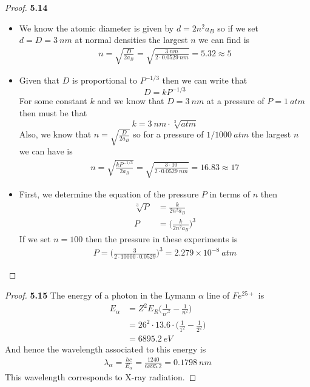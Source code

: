 \documentclass[11pt]{article}
\theoremstyle{definition}
\begin{document}
\begin{proof}{\textbf{5.14}}
\begin{itemize}
    \item [(a)] We know the atomic diameter is given by $d = 2n^2 a_B$
    so if we set $d = D = 3~nm$ at normal densities the largest $n$ we can find
    is
    \begin{align*}
        n = \sqrt{\frac{D}{2a_B}} = \sqrt{\frac{3~nm}{2\cdot 0.0529~nm}}
        = 5.32 \approx 5
    \end{align*}
    \item [(b)] Given that $D$ is proportional to $P^{-1/3}$ then we can write
    that
    $$D = k P^{-1/3}$$
    For some constant $k$ and we know that $D = 3~nm$ at a pressure of
    $P = 1~atm$ then must be that
    $$k = 3~nm\cdot \sqrt[3]{atm}$$
    Also, we know that $n = \sqrt{\frac{D}{2a_B}}$ so for a pressure of
    $1/1000~atm$ the largest $n$ we can have is
    \begin{align*}
        n = \sqrt{\frac{kP^{-1/3}}{2a_B}}
        = \sqrt{\frac{3 \cdot 10}{2\cdot 0.0529~nm}}
        = 16.83 \approx 17
    \end{align*}
    \item [(b)] First, we determine the equation of the pressure $P$ in terms
    of $n$ then
    \begin{align*}
        \sqrt[3]{P} &= \frac{k}{2n^2a_B}\\
        P &= \bigg(\frac{k}{2n^2a_B}\bigg)^3
    \end{align*}
    If we set $n = 100$ then the pressure in these experiments is
    \begin{align*}
        P = \bigg(\frac{3}{2\cdot 10000 \cdot 0.0529}\bigg)^3
        = 2.279 \times 10^{-8}~atm
    \end{align*}
\end{itemize}
\end{proof}
\cleardoublepage
\begin{proof}{\textbf{5.15}}
    The energy of a photon in the Lymann $\alpha$ line of $Fe^{25+}$ is
    \begin{align*}
        E_\alpha &= Z^2E_R\bigg(\frac{1}{n'^2} - \frac{1}{n^2}\bigg)\\
            &= 26^2\cdot 13.6\cdot\bigg(\frac{1}{1^2} - \frac{1}{2^2}\bigg)\\
            &= 6895.2~eV
    \end{align*}
    And hence the wavelength associated to this energy is
    \begin{align*}
        \lambda_\alpha = \frac{hc}{E_\alpha} = \frac{1240}{6895.2} = 0.1798~nm
    \end{align*}
    This wavelength corresponds to X-ray radiation.
\end{proof}
\end{document}
